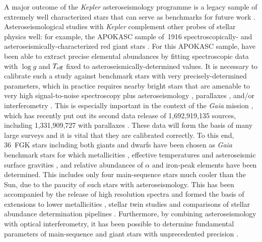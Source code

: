 \documentclass[a4paper,fleqn,usenatbib]{mnras}
\newcommand{\teff}{\mbox{$T_{\rm eff}$}\xspace}
\newcommand{\logg}{\mbox{$\log g$}\xspace}
\newcommand{\kepler}{\textit{Kepler}\xspace}
\newcommand{\gaia}{\textit{Gaia}\xspace}
\begin{document}
A major outcome of the \kepler asteroseismology programme is a legacy sample of extremely well characterized stars that can serve as benchmarks for future work \citep{keplerlegacy1,silvaaguirre2017,silvaaguirre2015,2016MNRAS.456.2183D}. Asteroseismological studies with \kepler complement other probes of stellar physics well: for example, the APOKASC sample of~1916 spectroscopically- and asteroseismically-characterized red giant stars \citep{2014ApJS..215...19P}. For this APOKASC sample, \citet{hawkinsapogee} have been able to extract precise elemental abundances by fitting spectroscopic data with \logg and \teff fixed to asteroseismically-determined values. It is necessary to calibrate such a study against benchmark stars with very precisely-determined parameters, which in practice requires nearby bright stars that are amenable to very high signal-to-noise spectroscopy plus asteroseismology \citep{creeveybenchmark}, parallaxes \citep{hawkinsbenchmarks}, and/or interferometry \citep{casagrandebenchmark,creeveybenchmark2}. This is especially important in the context of the \gaia mission \citep{gaia}, which has recently put out its second data release of 1,692,919,135 sources, including 1,331,909,727 with parallaxes \citep{gaiadr2}. These data will form the basis of many large surveys and it is vital that they are calibrated correctly. To this end, 36~FGK stars including both giants and dwarfs have been chosen as \gaia benchmark stars for which metallicities \citep{gaiabenchmark1,2018RNAAS...2c.152J}, effective temperatures and asteroseismic surface gravities \citep{gaiabenchmark3}, and relative abundances of $\alpha$ and iron-peak elements \citep{gaiabenchmark4} have been determined. This includes only four main-sequence stars much cooler than the Sun, due to the paucity of such stars with asteroseismology. This has been accompanied by the release of high resolution spectra \citep{gaiabenchmark2} and formed the basis of extensions to lower metallicities \citep{gaiabenchmark5}, stellar twin studies \citep{gaiabenchmarktwins} and comparisons of stellar abundance determination pipelines \citep{gaiabenchmarkabundances}. Furthermore, by combining asteroseismology with optical interferometry, it has been possible to determine fundamental parameters of main-sequence and giant stars with unprecedented precision \citep{huber12,thetacygwhite,white15}. 
\end{document}
